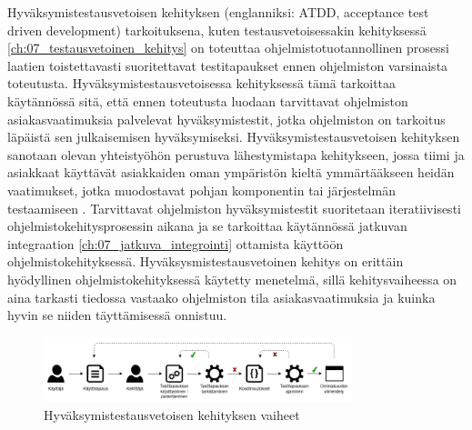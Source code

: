   Hyväksymistestausvetoisen kehityksen (englanniksi: ATDD, acceptance test driven development) tarkoituksena, kuten testausvetoisessakin kehityksessä \ref{ch:07_testausvetoinen_kehitys} on toteuttaa ohjelmistotuotannollinen prosessi laatien toistettavasti suoritettavat testitapaukset ennen ohjelmiston varsinaista toteutusta.
  Hyväksymistestausvetoisessa kehityksessä tämä tarkoittaa käytännössä sitä, että ennen toteutusta luodaan tarvittavat ohjelmiston asiakasvaatimuksia palvelevat hyväksymistestit, jotka ohjelmiston on tarkoitus läpäistä sen julkaisemisen hyväksymiseksi.
  Hyväksymistestausvetoisen kehityksen sanotaan olevan yhteistyöhön perustuva lähestymistapa kehitykseen, jossa tiimi ja asiakkaat käyttävät asiakkaiden oman ympäristön kieltä ymmärtääkseen heidän vaatimukset, jotka muodostavat pohjan komponentin tai järjestelmän testaamiseen \parencite{istqb_glossary_nodate}.
  Tarvittavat ohjelmiston hyväksymistestit suoritetaan iteratiivisesti ohjelmistokehitysprosessin aikana ja se tarkoittaa käytännössä jatkuvan integraation \ref{ch:07_jatkuva_integrointi} ottamista käyttöön ohjelmistokehityksessä.
  Hyväksysmistestausvetoinen kehitys on erittäin hyödyllinen ohjelmistokehityksessä käytetty menetelmä, sillä kehitysvaiheessa on aina tarkasti tiedossa vastaako ohjelmiston tila asiakasvaatimuksia ja kuinka hyvin se niiden täyttämisessä onnistuu.

  \begin{figure}[H]
    \centering
    \includegraphics[width=0.8\textwidth]{assets/hyvaksymistestausvetoinen-kehitys.png}
    \caption{Hyväksymistestausvetoisen kehityksen vaiheet}
    \label{fig:hyvaksymistestausvetoinen-kehitys}
  \end{figure}

